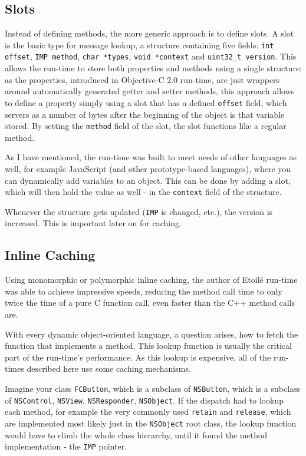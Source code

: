 \subsection{Slots}
Instead of defining methods, the more generic approach is to define slots. A slot is the basic type for message lookup, a structure containing five fields: \verb=int offset=, \verb=IMP method=, \verb=char *types=, \verb=void *context= and \verb=uint32_t version=. This allows the run-time to store both properties and methods using a single structure: as the properties, introduced in Objective-C 2.0 run-time, are just wrappers around automatically generated getter and setter methods, this approach allows to define a property simply using a slot that has a defined \verb=offset= field, which servers as a number of bytes after the beginning of the object is that variable stored. By setting the \verb=method= field of the slot, the slot functions like a regular method.

As I have mentioned, the run-time was built to meet needs of other languages as well, for example JavaScript (and other prototype-based languages), where you can dynamically add variables to an object. This can be done by adding a slot, which will then hold the value as well - in the \verb=context= field of the structure.

Whenever the structure gets updated (\verb=IMP= is changed, etc.), the version is increased. This is important later on for caching.


\subsection{Inline Caching}
Using monomorphic or polymorphic inline caching, the author of Etoilé run-time was able to achieve impressive speeds, reducing the method call time to only twice the time of a pure C function call, even faster than the C++ method calls are.

With every dynamic object-oriented language, a question arises, how to fetch the function that implements a method. This lookup function is usually the critical part of the run-time's performance. As this lookup is expensive, all of the run-times described here use some caching mechanisms.

Imagine your class \verb=FCButton=, which is a subclass of \verb=NSButton=, which is a subclass of \verb=NSControl=, \verb=NSView=, \verb=NSResponder=, \verb=NSObject=. If the dispatch had to lookup each method, for example the very commonly used \verb=retain= and \verb=release=, which are implemented most likely just in the \verb=NSObject= root class, the lookup function would have to climb the whole class hierarchy, until it found the method implementation - the \verb=IMP= pointer.

